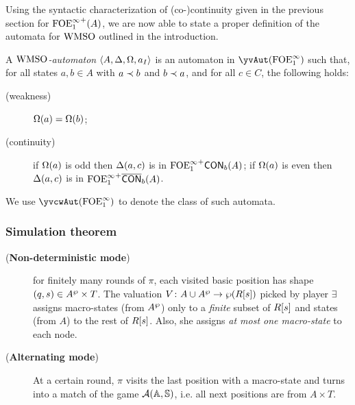 Using the syntactic characterization of (co-)continuity given in the previous section for ${\mathrm{FOE}^{\infty}_1}^+(A)$, we are now able to state a proper definition of the automata for $\mathrm{WMSO}$ outlined in the introduction.
\begin{definition}
\label{d:wmso-aut}
A \emph{$\mathrm{WMSO}$-automaton} $\langle{A,\Delta,\Omega,a_I}\rangle$ is an automaton in
$\yvAut(\olque)$ such that, for all states $a,b \in A$ with $a \prec b$ and
$b\prec a$, and for all $c \in C$, the following holds:
\begin{description}
\item[(weakness)] $\Omega(a)=\Omega(b)$;
\item[(continuity)]
  if $\Omega(a)$ is odd then $\Delta(a,c)$ is in ${\mathrm{FOE}^{\infty}_1}^+\mathsf{CON}_{b}(A)$;
  if $\Omega(a)$ is even then $\Delta(a,c)$ is in ${\mathrm{FOE}^{\infty}_1}^+\overline{\mathsf{CON}}_{b}(A)$.
\end{description}
We use $\yvcwAut(\olque)$ to denote the class of such automata.
\end{definition}






\subsubsection{Simulation theorem}

\begin{description}
  \item[(\textbf{Non-deterministic mode})] for finitely many rounds of $\pi$, each visited basic position has shape $(q,s) \in A^{\wp} \times T$. The valuation $V \colon A \cup A^{\wp} \to \wp (R[s])$ picked by player $\exists$ assigns macro-states (from $A^{\wp}$) only to a \emph{finite} subset of $R[s]$ and states (from $A$) to the rest of $R[s]$. Also, she assigns \emph{at most one macro-state} to each node.
  \item[(\textbf{Alternating mode})] At a certain round, $\pi$ visits the last position with a macro-state and turns into a match of the game $\mathcal{A}(\mathbb{A},\mathbb{S})$, i.e. all next positions are from $A \times T$. %
\end{description}


